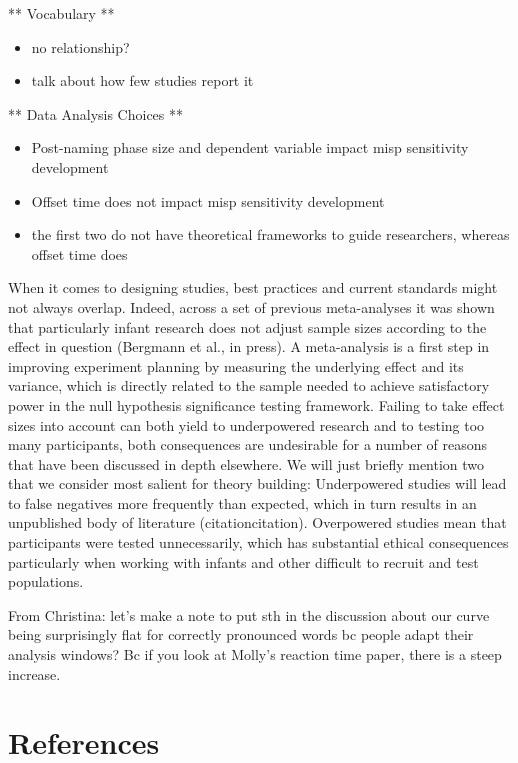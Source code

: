 \documentclass[man]{apa6}
\providecommand{\tightlist}{%
  \setlength{\itemsep}{0pt}\setlength{\parskip}{0pt}}
\theoremstyle{definition}
\theoremstyle{definition}
\theoremstyle{definition}
\theoremstyle{remark}
\begin{document}
** Vocabulary **

\begin{itemize}
\tightlist
\item
  no relationship?
\item
  talk about how few studies report it
\end{itemize}

** Data Analysis Choices **

\begin{itemize}
\tightlist
\item
  Post-naming phase size and dependent variable impact misp sensitivity
  development
\item
  Offset time does not impact misp sensitivity development
\item
  the first two do not have theoretical frameworks to guide researchers,
  whereas offset time does
\end{itemize}

When it comes to designing studies, best practices and current standards
might not always overlap. Indeed, across a set of previous meta-analyses
it was shown that particularly infant research does not adjust sample
sizes according to the effect in question (Bergmann et al., in press). A
meta-analysis is a first step in improving experiment planning by
measuring the underlying effect and its variance, which is directly
related to the sample needed to achieve satisfactory power in the null
hypothesis significance testing framework. Failing to take effect sizes
into account can both yield to underpowered research and to testing too
many participants, both consequences are undesirable for a number of
reasons that have been discussed in depth elsewhere. We will just
briefly mention two that we consider most salient for theory building:
Underpowered studies will lead to false negatives more frequently than
expected, which in turn results in an unpublished body of literature
(citationcitation). Overpowered studies mean that participants were
tested unnecessarily, which has substantial ethical consequences
particularly when working with infants and other difficult to recruit
and test populations.

From Christina: let's make a note to put sth in the discussion about our
curve being surprisingly flat for correctly pronounced words bc people
adapt their analysis windows? Bc if you look at Molly's reaction time
paper, there is a steep increase.

\newpage

\section{References}\label{references}

\begingroup
\setlength{\parindent}{-0.5in} \setlength{\leftskip}{0.5in}

\hypertarget{refs}{}

\endgroup
\end{document}

